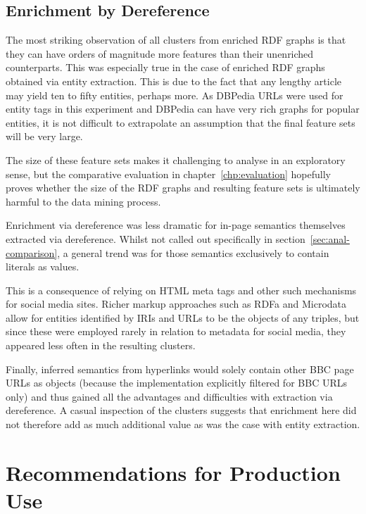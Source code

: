 \subsection{Enrichment by Dereference}
\label{sec:anal-enrichment}

The most striking observation of all clusters from enriched RDF
graphs is that they can have orders of magnitude more features than
their unenriched counterparts. This was especially true in the case
of enriched RDF graphs obtained via entity extraction. This is due
to the fact that any lengthy article may yield ten to fifty entities,
perhaps more. As DBPedia URLs were used for entity tags in this
experiment and DBPedia can have very rich graphs for popular entities,
it is not difficult to extrapolate an assumption that the final
feature sets will be very large.

The size of these feature sets makes it challenging to analyse in an
exploratory sense, but the comparative evaluation in
chapter~\ref{chp:evaluation} hopefully proves whether the size of the
RDF graphs and resulting feature sets is ultimately harmful to the
data mining process.

Enrichment via dereference was less dramatic for in-page semantics
themselves extracted via dereference. Whilst not called out
specifically in section~\ref{sec:anal-comparison}, a general trend
was for those semantics exclusively to contain literals as values.

This is a consequence of relying on HTML meta tags and other such
mechanisms for social media sites. Richer markup approaches such
as RDFa and Microdata allow for entities identified by IRIs and URLs
to be the objects of any triples, but since these were employed
rarely in relation to metadata for social media, they appeared
less often in the resulting clusters.

Finally, inferred semantics from hyperlinks would solely contain
other BBC page URLs as objects (because the implementation explicitly
filtered for BBC URLs only) and thus gained all the advantages and
difficulties with extraction via dereference. A casual inspection
of the clusters suggests that enrichment here did not therefore add
as much additional value as was the case with entity extraction.

\section{Recommendations for Production Use}
\label{sec:production-recommendations}

